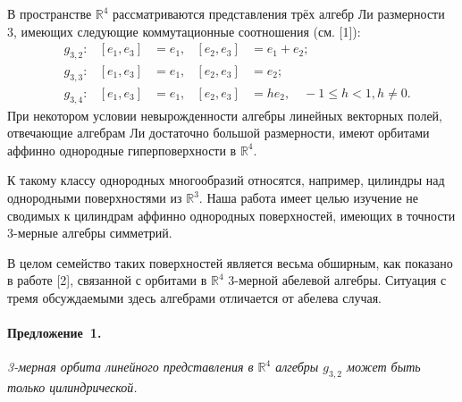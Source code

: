 
\vzmscaption


В пространстве $\mathbb{R}^4 $ рассматриваются представления трёх алгебр Ли размерности 3, имеющих следующие
коммутационные соотношения (см. [1]):
\begin{align*}
	&g_{3,2} : & [e_1,e_3] &= e_1, & [e_2,e_3] &= e_1 + e_2;\\
	&g_{3,3} : & [e_1,e_3] &= e_1, & [e_2,e_3] &= e_2;\\
	&g_{3,4} : & [e_1,e_3] &= e_1, & [e_2,e_3] &= h e_2, \quad -1 \leqslant h < 1, h \neq 0.
\end{align*}
При некотором условии невырожденности алгебры линейных векторных полей, отвечающие алгебрам Ли достаточно большой размерности, имеют орбитами аффинно однородные гиперповерхности в $\mathbb{R}^4$.

К такому классу однородных многообразий относятся, например, цилиндры над однородными поверхностями из $\mathbb{R}^3$.
Наша работа имеет целью изучение не сводимых к цилиндрам аффинно однородных поверхностей, имеющих в точности 3-мерные алгебры симметрий.

В целом семейство таких поверхностей является весьма обширным, как показано в работе [2], связанной с орбитами в $\mathbb{R}^4$ 3-мерной абелевой алгебры. Ситуация с тремя обсуждаемыми здесь алгебрами отличается от абелева случая.

\paragraph{Предложение~1.}
{\it
3-мерная орбита линейного представления в $\mathbb{R}^4$ алгебры $g_{3,2}$ может быть только цилиндрической.
}

